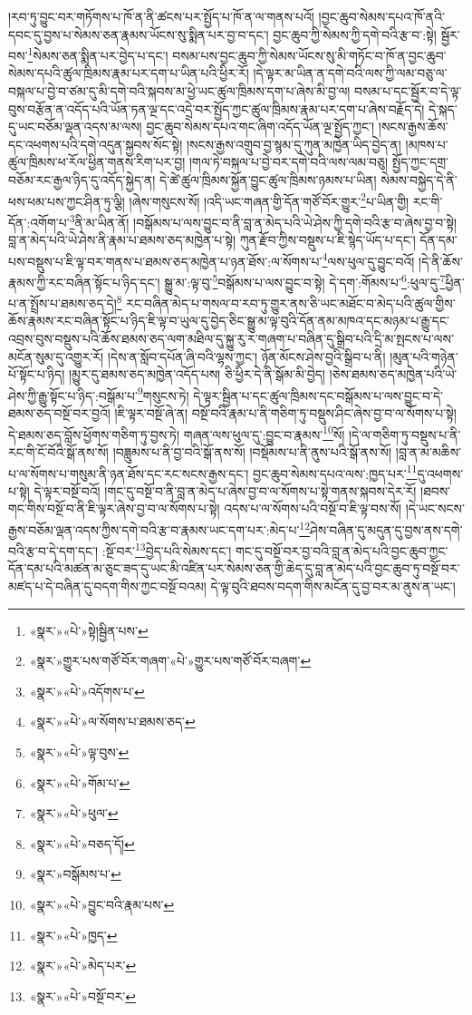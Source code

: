 །རབ་ཏུ་བྱུང་བར་གཏོགས་པ་ཁོ་ན་ནི་ཚངས་པར་སྤྱོད་པ་ཁོ་ན་ལ་གནས་པའོ། །བྱང་ཆུབ་སེམས་དཔའ་ཁོ་ནའི་དབང་དུ་བྱས་པ་སེམས་ཅན་རྣམས་ཡོངས་སུ་སྨིན་པར་བྱ་བ་དང་། བྱང་ཆུབ་ཀྱི་སེམས་ཀྱི་དགེ་བའི་རྩ་བ་:སྟེ། སྦྱོར་བས་\footnote{«སྣར་»«པེ་»སྟེ།སྦྱིན་པས་}སེམས་ཅན་སྨིན་པར་བྱེད་པ་དང་། བསམ་པས་བྱང་ཆུབ་ཀྱི་སེམས་ཡོངས་སུ་མི་གཏོང་བ་ཁོ་ན་བྱང་ཆུབ་སེམས་དཔའི་ཚུལ་ཁྲིམས་རྣམ་པར་དག་པ་ཡིན་པའི་ཕྱིར་རོ། །དེ་ལྟར་མ་ཡིན་ན་དགེ་བའི་ལས་ཀྱི་ལམ་བཅུ་ལ་བསྐལ་པ་བྱེ་བ་ཙམ་དུ་མི་དགེ་བའི་སྐབས་མ་ཕྱེ་ཡང་ཚུལ་ཁྲིམས་དག་པ་ཞེས་མི་བྱ་ལ། བསམ་པ་དང་སྦྱོར་བ་དེ་ལྟ་བུས་བརྩོན་ན་འདོད་པའི་ཡོན་ཏན་ལྔ་དང་འདྲེ་བར་སྤྱོད་ཀྱང་ཚུལ་ཁྲིམས་རྣམ་པར་དག་པ་ཞེས་བརྗོད་དེ། དེ་སྐད་དུ་ཡང་བཅོམ་ལྡན་འདས་མ་ལས། བྱང་ཆུབ་སེམས་དཔའ་གང་ཞིག་འདོད་ཡོན་ལྔ་སྤྱོད་ཀྱང་། །སངས་རྒྱས་ཆོས་དང་འཕགས་པའི་དགེ་འདུན་སྐྱབས་སོང་སྟེ། །སངས་རྒྱས་འགྲུབ་བྱ་སྙམ་དུ་ཀུན་མཁྱེན་ཡིད་བྱེད་ན། །མཁས་པ་ཚུལ་ཁྲིམས་ཕ་རོལ་ཕྱིན་གནས་རིག་པར་བྱ། །གལ་ཏེ་བསྐལ་པ་བྱེ་བར་དགེ་བའི་ལས་ལམ་བཅུ། སྤྱོད་ཀྱང་དགྲ་བཅོམ་རང་རྒྱལ་ཉིད་དུ་འདོད་སྐྱེད་ན། དེ་ཚེ་ཚུལ་ཁྲིམས་སྐྱོན་བྱུང་ཚུལ་ཁྲིམས་ཉམས་པ་ཡིན། སེམས་བསྐྱེད་དེ་ནི་ཕས་ཕམ་པས་ཀྱང་ཤིན་ཏུ་ལྕི། །ཞེས་གསུངས་སོ། །འདི་ཡང་གཞན་གྱི་དོན་གཙོ་བོར་གྱུར་\footnote{«སྣར་»གྱུར་པས་གཙོ་བོར་གཞག་«པེ་»གྱུར་པས་གཙོ་བོར་བཞག་}པ་ཡིན་གྱི། རང་གི་དོན་:འགོག་པ་\footnote{«སྣར་»«པེ་»འདོགས་པ་}ནི་མ་ཡིན་ནོ། །བསྒོམས་པ་ལས་བྱུང་བ་ནི་བླ་ན་མེད་པའི་ཡེ་ཤེས་ཀྱི་དགེ་བའི་རྩ་བ་ཞེས་བྱ་བ་སྟེ། བླ་ན་མེད་པའི་ཡེ་ཤེས་ནི་རྣམ་པ་ཐམས་ཅད་མཁྱེན་པ་སྟེ། ཀུན་རྫོབ་ཀྱིས་བསྡུས་པ་ཇི་སྙེད་ཡོད་པ་དང་། དོན་དམ་པས་བསྡུས་པ་ཇི་ལྟ་བར་གནས་པ་ཐམས་ཅད་མཁྱེན་པ་ཉན་ཐོས་:ལ་སོགས་པ་\footnote{«སྣར་»«པེ་»ལ་སོགས་པ་ཐམས་ཅད་}ལས་ཕུལ་དུ་བྱུང་བའོ། །དེ་ནི་ཆོས་རྣམས་ཀྱི་རང་བཞིན་སྟོང་པ་ཉིད་དང་། སྒྱུ་མ་:ལྟ་བུ་\footnote{«སྣར་»«པེ་»ལྟ་བུས་}བསྒོམས་པ་ལས་བྱུང་བ་སྟེ། དེ་དག་:གོམས་པ་\footnote{«སྣར་»«པེ་»གོམ་པ་}:ཕུལ་དུ་\footnote{«སྣར་»«པེ་»ཕུལ་}ཕྱིན་པ་ན་སྤྲོས་པ་ཐམས་ཅད་དེ།\footnote{«སྣར་»«པེ་»བཅད་དོ།} རང་བཞིན་མེད་པ་གསལ་བ་རབ་ཏུ་གྱུར་ནས་ཅི་ཡང་མཐོང་བ་མེད་པའི་ཚུལ་གྱིས་ཆོས་རྣམས་རང་བཞིན་སྟོང་པ་ཉིད་ཇི་ལྟ་བ་ཡུལ་དུ་བྱེད་ཅིང་སྒྱུ་མ་ལྟ་བུའི་དོན་ནམ་མཁའ་དང་མཉམ་པ་རྒྱུ་དང་འབྲས་བུས་བསྡུས་པའི་ཆོས་ཐམས་ཅད་ལག་མཐིལ་དུ་སྐྱུ་རུ་ར་གཞག་པ་བཞིན་དུ་སྒྲིབ་པའི་དྲི་མ་སྤངས་པ་ལས་མངོན་སུམ་དུ་འགྱུར་རོ། །དེས་ན་སློབ་དཔོན་ཞི་བའི་ལྷས་ཀྱང་། ཉོན་མོངས་ཤེས་བྱའི་སྒྲིབ་པ་ནི། །མུན་པའི་གཉེན་པོ་སྟོང་པ་ཉིད། །མྱུར་དུ་ཐམས་ཅད་མཁྱེན་འདོད་པས། ཅི་ཕྱིར་དེ་ནི་སྒོམ་མི་བྱེད། །ཅེས་ཐམས་ཅད་མཁྱེན་པའི་ཡེ་ཤེས་ཀྱི་རྒྱུ་སྟོང་པ་ཉིད་:བསྒོམ་པ་\footnote{«སྣར་»བསྒོམས་པ་}གསུངས་ཏེ། དེ་ལྟར་སྦྱིན་པ་དང་ཚུལ་ཁྲིམས་དང་བསྒོམས་པ་ལས་བྱུང་བ་དེ་ཐམས་ཅད་བསྔོ་བར་བྱའོ། །ཇི་ལྟར་བསྔོ་ཞེ་ན། བསྔོ་བའི་རྣམ་པ་ནི་གཅིག་ཏུ་བསྡུས་ཤིང་ཞེས་བྱ་བ་ལ་སོགས་པ་སྟེ། དེ་ཐམས་ཅད་བློས་ཕྱོགས་གཅིག་ཏུ་བྱས་ཏེ། གཞན་ལས་ཕུལ་དུ་:བྱུང་བ་རྣམས་\footnote{«སྣར་»«པེ་»བྱུང་བའི་རྣམ་པས་}སོ། །དེ་ལ་གཅིག་ཏུ་བསྡུས་པ་ནི་རང་གི་ངོ་བོའི་སྒོ་ནས་སོ། །བཟླུམས་པ་ནི་བྱ་བའི་སྒོ་ནས་སོ། །བསྡོམས་པ་ནི་ནུས་པའི་སྒོ་ནས་སོ། །བླ་ན་མ་མཆིས་པ་ལ་སོགས་པ་གསུམ་ནི་ཉན་ཐོས་དང་རང་སངས་རྒྱས་དང་། བྱང་ཆུབ་སེམས་དཔའ་ལས་:ཁྱད་པར་\footnote{«སྣར་»«པེ་»ཁྱད་}དུ་འཕགས་པ་སྟེ། དེ་ལྟར་བསྔོ་བའོ། །གང་དུ་བསྔོ་བ་ནི་བླ་ན་མེད་པ་ཞེས་བྱ་བ་ལ་སོགས་པ་སྟེ་གནས་སྐབས་དེར་རོ། །ཐབས་གང་གིས་བསྔོ་བ་ནི་ཇི་ལྟར་ཞེས་བྱ་བ་ལ་སོགས་པ་སྟེ། འདས་པ་ལ་སོགས་པའི་བསྔོ་བ་ཇི་ལྟ་བས་སོ། །དེ་ཡང་སངས་རྒྱས་བཅོམ་ལྡན་འདས་ཀྱིས་དགེ་བའི་རྩ་བ་རྣམས་ཡང་དག་པར་:མེད་པ་\footnote{«སྣར་»«པེ་»མེད་པར་}ཤེས་བཞིན་དུ་མདུན་དུ་བྱས་ནས་དགེ་བའི་རྩ་བ་དེ་དག་དང་། :སྔོ་བར་\footnote{«སྣར་»«པེ་»བསྔོ་བར་}བྱེད་པའི་སེམས་དང་། གང་དུ་བསྔོ་བར་བྱ་བའི་བླ་ན་མེད་པའི་བྱང་ཆུབ་ཀྱང་དོན་དམ་པའི་མཚན་མ་ཅུང་ཟད་དུ་ཡང་མི་འཛིན་པར་སེམས་ཅན་གྱི་ཆེད་དུ་བླ་ན་མེད་པའི་བྱང་ཆུབ་ཏུ་བསྔོ་བར་མཛད་པ་དེ་བཞིན་དུ་བདག་གིས་ཀྱང་བསྔོ་བའམ། དེ་ལྟ་བུའི་ཐབས་བདག་གིས་མངོན་དུ་བྱ་བར་མ་ནུས་ན་ཡང་། 